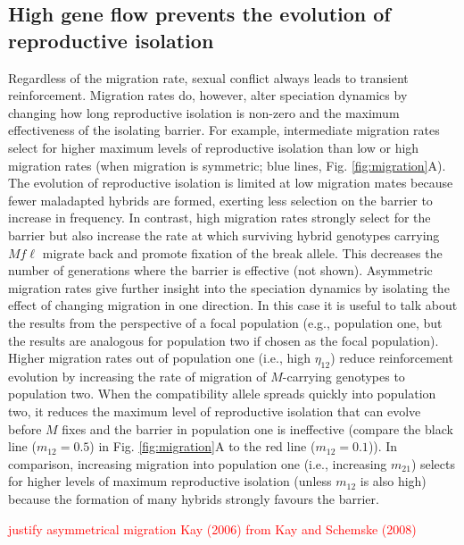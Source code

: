 \documentclass[11pt]{article}
\begin{document}
\FloatBarrier

\subsection*{High gene flow prevents the evolution of reproductive isolation}\label{section:migration}

Regardless of the migration rate, sexual conflict always leads to transient reinforcement. Migration rates do, however, alter speciation dynamics by changing how long reproductive isolation is non-zero and the maximum effectiveness of the isolating barrier.  For example, intermediate migration rates select for higher maximum levels of reproductive isolation than low or high migration rates (when migration is symmetric; blue lines, Fig. \ref{fig:migration}A). The evolution of reproductive isolation is limited at low migration mates because fewer maladapted hybrids are formed, exerting less selection on the barrier to increase in frequency. In contrast, high migration rates strongly select for the barrier but also increase the rate at which surviving hybrid genotypes carrying $Mf\ell$ migrate back and promote fixation of the break allele.  This decreases the number of generations where the barrier is effective (not shown). Asymmetric migration rates give further insight into the speciation dynamics by isolating the effect of changing migration in one direction. In this case it is useful to talk about the results from the perspective of a focal population (e.g., population one, but the results are analogous for population two if chosen as the focal population). Higher migration rates out of population one (i.e., high $\eta_{12}$) reduce reinforcement evolution by increasing the rate of migration of $M$-carrying genotypes to population two. When the compatibility allele spreads quickly into population two, it reduces the maximum level of reproductive isolation that can evolve before $M$ fixes and the barrier in population one is ineffective (compare the black line ($m_{12}  = 0.5$) in Fig. \ref{fig:migration}A to the red line ($m_{12} = 0.1$)). In comparison, increasing migration into population one (i.e., increasing $m_{21}$) selects for higher levels of maximum reproductive isolation (unless $m_{12}$ is also high) because the formation of many hybrids strongly favours the barrier. 

\textcolor{red}{justify asymmetrical migration Kay (2006) from Kay and Schemske (2008)}
\end{document}
